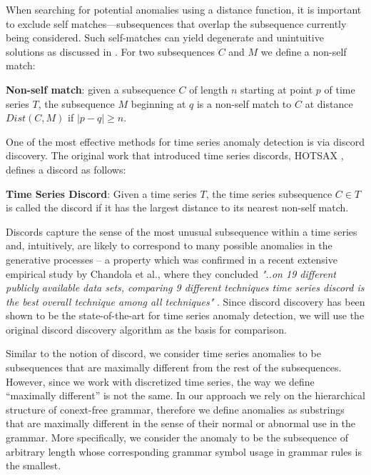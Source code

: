 \documentclass{llncs}
\begin{document}

When searching for potential anomalies using a distance function, it is important to exclude self matches---subsequences that overlap the subsequence currently being considered. Such self-matches can yield degenerate and unintuitive solutions as discussed in \cite{hot_sax}. For two subsequences $C$ and $M$ we define a non-self match:
\begin{definition}
\textbf{Non-self match}: given a subsequence $C$ of  length $n$ starting at point $p$ of  
time series $T$, the subsequence $M$ beginning at $q$ is a non-self match to $C$ at distance 
$Dist(C,M)$ if $|p-q| \geq n$.
\end{definition}

One of the most effective methods for time series anomaly detection is via discord discovery. The original work that introduced time series discords, HOTSAX \cite{hot_sax}, defines a discord as follows:

\begin{definition}
\textbf{Time Series Discord}: Given a time series $T$, the time series subsequence $C \in T$ is called the discord if it has the largest distance to its nearest non-self match.
\end{definition}

Discords capture the sense of the most unusual subsequence within a time series and, intuitively, are likely to correspond to many possible anomalies in the generative processes -- a property which was confirmed in a recent extensive empirical study by Chandola et al., where they concluded \textit{"..on 19 different publicly available data sets, comparing 9 different techniques time series discord is the best overall technique among all techniques"} \cite{chan_anomaly}. Since discord discovery has been shown to be the state-of-the-art for time series anomaly detection, we will use the original discord discovery algorithm as the basis for comparison. 

Similar to the notion of discord, we consider time series anomalies to be subsequences that are maximally different from the rest of the subsequences. However, since we work with discretized time series, the way we define ``maximally different'' is not the same. In our approach we rely on the hierarchical structure of conext-free grammar, therefore we define anomalies as substrings that are maximally different in the sense of their normal or abnormal use in the grammar. More specifically, we consider the anomaly to be the subsequence of arbitrary length whose corresponding grammar symbol usage in grammar rules is the smallest.  
\end{document}
